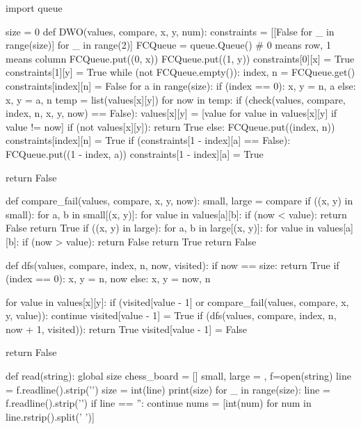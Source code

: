 ﻿\documentclass[a4paper, 11pt]{article}
\begin{document}
\begin{python}
import queue

size = 0
def DWO(values, compare, x, y, num):
    constraints = [[False for _ in range(size)] for _ in range(2)]
    FCQueue = queue.Queue()
    # 0 means row, 1 means column
    FCQueue.put((0, x))
    FCQueue.put((1, y))
    constraints[0][x] = True
    constraints[1][y] = True
    while (not FCQueue.empty()):
        index, n = FCQueue.get()
        constraints[index][n] = False
        for a in range(size):
            if (index == 0):
                x, y = n, a
            else:
                x, y = a, n
            temp = list(values[x][y])
            for now in temp:
                if (check(values, compare, index, n, x, y, now) == False):
                    values[x][y] = [value for value in values[x][y] if value != now]
                    if (not values[x][y]):
                        return True
                    else:
                        FCQueue.put((index, n))
                        constraints[index][n] = True
                        if (constraints[1 - index][a] == False):
                            FCQueue.put((1 - index, a))
                            constraints[1 - index][a] = True

    return False


def compare_fail(values, compare, x, y, now):
    small, large = compare
    if ((x, y) in small):
        for a, b in small[(x, y)]:
            for value in values[a][b]:
                if (now < value):
                    return False
        return True
    if ((x, y) in large):
        for a, b in large[(x, y)]:
            for value in values[a][b]:
                if (now > value):
                    return False
        return True
    return False


def dfs(values, compare, index, n, now, visited):
    if now == size:
        return True
    if (index == 0):
        x, y = n, now
    else:
        x, y = now, n

    for value in values[x][y]:
        if (visited[value - 1] or compare_fail(values, compare, x, y, value)):
            continue
        visited[value - 1] = True
        if (dfs(values, compare, index, n, now + 1, visited)):
            return True
        visited[value - 1] = False

    return False


def read(string):
    global size
    chess_board = []
    small, large = {}, {}
    f=open(string)
    line = f.readline().strip('\n')
    size = int(line)
    print(size)
    for _ in range(size):
        line = f.readline().strip('\n')
        if line == '':
            continue
        nums = [int(num) for num in line.rstrip().split(' ')]


\end{python}
\end{document}
